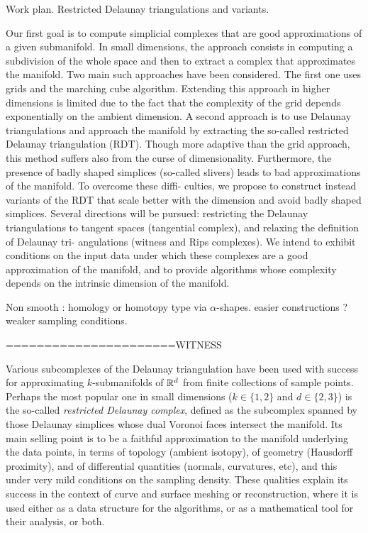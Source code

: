 Work plan.	Restricted Delaunay triangulations and variants. 

Our first goal is to compute simplicial complexes that are good approximations of a given submanifold. In small dimensions, the approach consists in computing a subdivision of the whole space and then to extract a complex that approximates the manifold. Two main such approaches have been considered. The first one uses grids and the marching cube algorithm. Extending this approach in higher dimensions is limited due to the fact that the complexity of the grid depends exponentially on the ambient dimension. A second approach is to use Delaunay triangulations and approach the manifold by extracting the so-called restricted Delaunay triangulation (RDT). Though more adaptive than the grid approach, this method suffers also from the curse of dimensionality. Furthermore, the presence of badly shaped simplices (so-called slivers) leads to bad approximations of the manifold. To overcome these diffi- culties, we propose to construct instead variants of the RDT that scale better with the dimension and avoid badly shaped simplices. Several directions will be pursued: restricting the Delaunay triangulations to tangent spaces (tangential complex), and relaxing the definition of Delaunay tri- angulations (witness and Rips complexes). We intend to exhibit conditions on the input data under which these complexes are a good approximation of the manifold, and to provide algorithms whose complexity depends on the intrinsic dimension of the manifold.

Non smooth : homology or homotopy type via $\alpha$-shapes. easier constructions ?
weaker sampling conditions.



======================WITNESS

Various subcomplexes of the Delaunay triangulation have been used with
success for approximating $k$-submanifolds of $\mathbb R^d$ from finite
collections of sample points. Perhaps the most popular one in small
dimensions ($k\in\{1,2\}$ and $d\in\{2,3\}$) is the so-called {\em
  restricted Delaunay complex}, defined as the subcomplex spanned by
those Delaunay simplices whose dual Voronoi faces intersect the
manifold. Its main selling point is to be a faithful approximation to
the manifold underlying the data points, in terms of topology (ambient
isotopy), of geometry (Hausdorff proximity), and of differential
quantities (normals, curvatures, etc), and this under very mild
conditions on the sampling density. These qualities explain its
success in the context of curve and surface meshing or
reconstruction, where it is used either as a data structure for the
algorithms, or as a mathematical tool for their analysis, or both.

